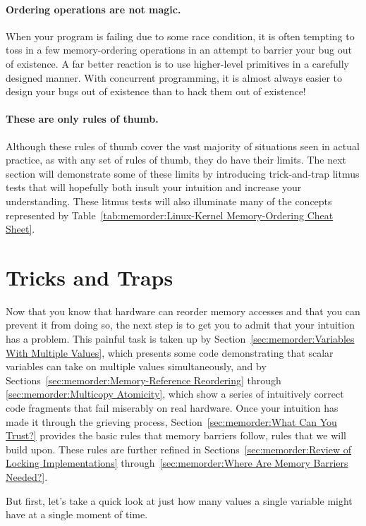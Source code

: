 \paragraph{Ordering operations are not magic.}
When your program is failing due to some race condition, it is often
tempting to toss in a few memory-ordering operations in an attempt
to barrier your bug out of existence.
A far better reaction is to use higher-level primitives in a carefully
designed manner.
With concurrent programming, it is almost always easier to design
your bugs out of existence than to hack them out of existence!

\paragraph{These are only rules of thumb.}
Although these rules of thumb cover the vast majority of situations
seen in actual practice, as with any set of rules of thumb, they
do have their limits.
The next section will demonstrate some of these limits by introducing
trick-and-trap litmus tests that will hopefully both insult your
intuition and increase your understanding.
These litmus tests will also illuminate many of the concepts
represented by
Table~\ref{tab:memorder:Linux-Kernel Memory-Ordering Cheat Sheet}.

\section{Tricks and Traps}
\label{sec:memorder:Tricks and Traps}

Now that you know that hardware can reorder memory accesses and that you
can prevent it from doing so, the next step is to get you to admit
that your intuition has a problem.
This painful task is taken up by
Section~\ref{sec:memorder:Variables With Multiple Values},
which presents some code demonstrating that scalar variables can
take on multiple values simultaneously,
and by
Sections~\ref{sec:memorder:Memory-Reference Reordering} through
\ref{sec:memorder:Multicopy Atomicity},
which show a series of intuitively correct code fragments that fail miserably
on real hardware.
Once your intuition has made it through the grieving process,
Section~\ref{sec:memorder:What Can You Trust?}
provides the basic rules that memory barriers follow, rules that we
will build upon.
These rules are further refined in
Sections~\ref{sec:memorder:Review of Locking Implementations}
through~\ref{sec:memorder:Where Are Memory Barriers Needed?}.

But first, let's take a quick look at just how many values a single
variable might have at a single moment of time.


